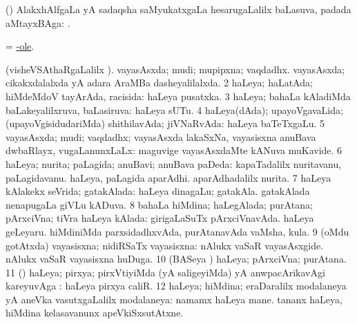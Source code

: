 \bentry
{}
\gl{\uparx}
\bmng
(\ravi) AlakxhAlfgaLa yA sadaqsha saMyukatxgaLa hesarugaLalilx baLasuva,  padada aMtayxBAga: . 
\emng
\eentry

\bentry
{}
\gl{\saupa}
\bmng
= \hyperlink{hyp-ole}{-ole}. 
\emng
\eentry

\bentry
{}
\gl{\gu}
\bmng
(visheVSAthaRgaLalilx ). 
\bnum
{} 
\banum
{} vayasAsxda; mudi; mupipxna; vaqdadhx. 
 vayasAsxda; cikakxdalalxda yA adara AraMBa dasheyalilalxda. 
\eanum
\numie
\num{2} haLeya; haLatAda; hiMdeMdoV tayArAda, racisida:  haLeya pusatxka. 
\num{3} haLeya; bahaLa kAladiMda baLakeyalilxruva, baLasiruva:  haLeya sUTu. 
\num{4} haLeya(dAda); upayoVgavaLida; (upayoVgisidudariMda) shithilavAda; jiVNaRvAda:  haLeya baTeTxgaLu. 
\num{5} vayasAsxda; mudi; vaqdadhx; vayasAsxda lakaSxNa, vayasisxna anuBava dwbaRlayx, \mo vugaLanunxLaLx:  maguvige vayasAsxdaMte kANuva muKavide. 
\num{6} haLeya; nurita; paLagida; anuBavi; anuBava paDeda:  kapaTadalilx nuritavanu, paLagidavanu.  haLeya, paLagida aparAdhi.  aparAdhadalilx nurita. 
\num{7} haLeya kAlakekx seVrida; gatakAlada:  haLeya dinagaLu; gatakAla.  gatakAlada nenapugaLa giVLu kADuva. 
\num{8} bahaLa hiMdina; haLegAlada; purAtana; pArxciVna; tiVra haLeya kAlada:  girigaLaSuTx pArxciVnavAda.  haLeya geLeyaru.  hiMdiniMda parxsidadhxvAda, purAtanavAda vaMsha, kula. 
\num{9} (oMdu gotAtxda) vayasisxna; nidiRSaTx vayasisxna:  nAlukx vaSaR vayasAsxgide.  nAlukx vaSaR vayasisxna huDuga. 
\num{10} (BASeya \vi) haLeya; pArxciVna; purAtana. 
\num{11} (\AmA) haLeya; pirxya; pirxVtiyiMda (yA saligeyiMda) yA anwpacArikavAgi kareyuvAga \parx:  haLeya pirxya caliR. 
\num{12} haLeya; hiMdina; eraDaralilx modalaneya yA aneVka vasutxgaLalilx modalaneya:  namamx haLeya mane.  tananx haLeya, hiMdina kelasavanunx apeVkiSxsutAtxne. 
\enum
\emng

